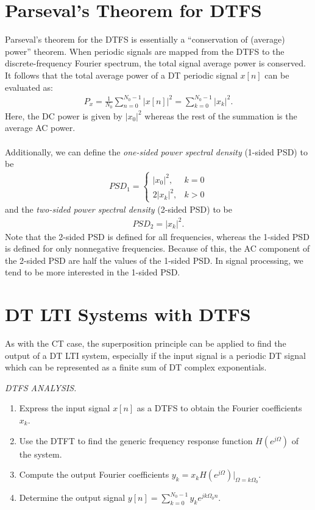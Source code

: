 \documentclass{report}
\begin{document}
\section{Parseval's Theorem for DTFS}
Parseval's theorem for the DTFS is essentially a ``conservation of (average) power'' theorem. When periodic signals are mapped from the DTFS to the discrete-frequency Fourier spectrum, the 
total signal average power is conserved. It follows that the total average power of a DT periodic signal $x[n]$ can be evaluated as: 
\begin{align}
    P_x = \frac{1}{N_0}\sum_{n=0}^{N_0-1} |x[n]|^2 = \sum_{k=0}^{N_0-1} |x_k|^2.
\end{align}
Here, the DC power is given by $|x_0|^2$ whereas the rest of the summation is the average AC power.
\\ \\
Additionally, we can define the \emph{one-sided power spectral density} (1-sided PSD) to be 
\begin{align}
    PSD_1 = 
    \begin{cases}
        |x_0|^2, & k=0 \\
        2|x_k|^2, & k>0
    \end{cases}
\end{align}
and the \emph{two-sided power spectral density} (2-sided PSD) to be 
\begin{align}
    PSD_2 = |x_k|^2.
\end{align}
Note that the 2-sided PSD is defined for all frequencies, whereas the 1-sided PSD is defined for only nonnegative frequencies. 
Because of this, the AC component of the 2-sided PSD are half the values of the 1-sided PSD. In signal processing, we tend to be more interested in the 1-sided PSD.

\section{DT LTI Systems with DTFS}
As with the CT case, the superposition principle can be applied to find the output of a DT LTI system, especially if the input signal is a periodic DT signal which 
can be represented as a finite sum of DT complex exponentials. 

\begin{tcolorbox}[width=\textwidth,colback={white}, sharp corners]
\emph{DTFS ANALYSIS.}
    \begin{enumerate}
        \item Express the input signal $x[n]$ as a DTFS to obtain the Fourier coefficients $x_k$.
        \item Use the DTFT to find the generic frequency response function $H(e^{j\Omega})$ of the system.
        \item Compute the output Fourier coefficients $y_k = x_k H(e^{j\Omega})\big|_{\Omega=k\Omega_0}$.
        \item Determine the output signal $y[n] = \displaystyle\sum_{k=0}^{N_0-1} y_k e^{jk\Omega_0 n}$.
    \end{enumerate}
\end{tcolorbox}
\end{document}
